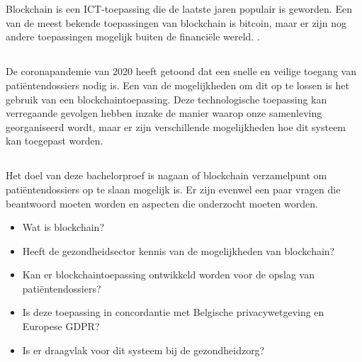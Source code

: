 
\chapter{}
\label{ch:inleiding}

Blockchain is een ICT-toepassing die de laatste jaren populair is geworden. Een van de meest bekende toepassingen van blockchain is bitcoin, maar er zijn nog andere toepassingen mogelijk buiten de financiële wereld. \autocite{Pilkington2016}.

\section{}
\label{sec:probleemstelling}

De coronapandemie van 2020 heeft getoond dat een snelle en veilige toegang van patiëntendossiers nodig is. Een van de mogelijkheden om dit op te lossen is het gebruik van een blockchaintoepassing. Deze technologische toepassing kan verregaande gevolgen hebben inzake de manier waarop onze samenleving georganiseerd wordt, maar er zijn verschillende mogelijkheden hoe dit systeem kan toegepast worden.

\section{}
\label{sec:onderzoeksvraag}

Het doel van deze bachelorproef is nagaan of blockchain verzamelpunt om patiëntendossiers op te slaan mogelijk is. Er zijn evenwel een paar vragen die beantwoord moeten worden en aspecten die onderzocht moeten worden.

\begin{itemize}
    \item Wat is blockchain?
    \item Heeft de gezondheidsector kennis van de mogelijkheden van blockchain?
    \item Kan er blockchaintoepassing ontwikkeld worden voor de opslag van patiëntendossiers?
    \item Is deze toepassing in concordantie met Belgische privacywetgeving en Europese GDPR?
    \item Is er draagvlak voor dit systeem bij de gezondheidzorg?
    
\end{itemize}

